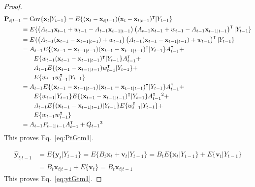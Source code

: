 \documentclass[12pt]{article}
\begin{document}
\begin{proof}
    \begin{align}
        \mathbf{P}_{t|t-1}&=\text{Cov}\{\mathbf{x}_t|Y_{t-1}\}=E\{(\mathbf{x}_t-\mathbf{x}_{t|t-1})(\mathbf{x}_t-\mathbf{x}_{t|t-1})^\intercal|Y_{t-1}\}\nonumber\\
                          &=E\{\left(A_{t-1}\mathbf{x}_{t-1}+w_{t-1}-A_{t-1}\mathbf{x}_{t-1|t-1}\right)\left(A_{t-1}\mathbf{x}_{t-1}+w_{t-1}-A_{t-1}\mathbf{x}_{t-1|t-1}\right)^\intercal|Y_{t-1}\}\nonumber\\
                          &=E\{\left(A_{t-1}(\mathbf{x}_{t-1}-\mathbf{x}_{t-1|t-1})+w_{t-1}\right)\left(A_{t-1}(\mathbf{x}_{t-1}-\mathbf{x}_{t-1|t-1})+w_{t-1}\right)^\intercal|Y_{t-1}\}\nonumber\\
                          &=A_{t-1}E\{(\mathbf{x}_{t-1}-\mathbf{x}_{t-1|t-1})(\mathbf{x}_{t-1}-\mathbf{x}_{t-1|t-1})^\intercal|Y_{t-1}\}A_{t-1}^\intercal+\nonumber\\
                          &\qquad E\{w_{t-1}(\mathbf{x}_{t-1}-\mathbf{x}_{t-1|t-1})^\intercal|Y_{t-1}\}A_{t-1}^\intercal+\nonumber\\
                          &\qquad A_{t-1}E\{(\mathbf{x}_{t-1}-\mathbf{x}_{t-1|t-1})w_{t-1}^\intercal|Y_{t-1}\}+\nonumber\\
                          &\qquad E\{w_{t-1}w_{t-1}^\intercal|Y_{t-1}\}\nonumber\\
                          &=A_{t-1}E\{(\mathbf{x}_{t-1}-\mathbf{x}_{t-1|t-1})(\mathbf{x}_{t-1}-\mathbf{x}_{t-1|t-1})^\intercal|Y_{t-1}\}A_{t-1}^\intercal+\nonumber\\
                          &\qquad E\{w_{t-1}|Y_{t-1}\}E\{(\mathbf{x}_{t-1}-\mathbf{x}_{t-1|t-1})^\intercal|Y_{t-1}\}A_{t-1}^\intercal\footnotemark[2]+\nonumber\\
                          &\qquad A_{t-1}E\{(\mathbf{x}_{t-1}-\mathbf{x}_{t-1|t-1})|Y_{t-1}\}E\{w_{t-1}^\intercal|Y_{t-1}\}+\nonumber\\
                          &\qquad E\{w_{t-1}w_{t-1}^\intercal\}\nonumber\\
                          &=A_{t-1}P_{t-1|t-1}A_{t-1}^\intercal+Q_{t-1}\footnotemark[3]\nonumber
    \end{align}
	This proves Eq.~\ref{eq:PtGtm1}.

    \begin{align}
        \hat{\mathbf{y}}_{t|t-1}&=E\{\mathbf{y}_t|Y_{t-1}\}=E\{B_t\mathbf{x}_t+\mathbf{v}_t|Y_{t-1}\}=B_tE\{\mathbf{x}_t|Y_{t-1}\}+E\{\mathbf{v}_t|Y_{t-1}\}\nonumber\\
                                &=B_t\mathbf{x}_{t|t-1}+E\{\mathbf{v}_t\}=B_t\mathbf{x}_{t|t-1}\nonumber
    \end{align}
	This proves Eq.~\ref{eq:ytGtm1}.


\end{proof}
\end{document}
